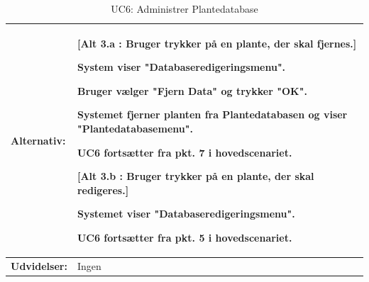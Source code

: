 \begin{table}[h]
\begin{tabularx}{\textwidth}{| >{\raggedright\arraybackslash}p{3.3 cm} | >{\raggedright\arraybackslash}X |}
\textbf{Alternativ:}				& 
\textbf{{[}Alt 3.a : Bruger trykker på en plante, der skal fjernes.{]}}
\begin{packed_enum}
\setcounter{enumi}{3}
\item System viser "Databaseredigeringsmenu".
\item Bruger vælger "Fjern Data" og trykker "OK".
\item Systemet fjerner planten fra Plantedatabasen og viser "Plantedatabasemenu".
\item UC6 fortsætter fra pkt. 7 i hovedscenariet. 
\end{packed_enum}
\textbf{{[}Alt 3.b : Bruger trykker på en plante, der skal redigeres.{]}}
\begin{packed_enum}
\setcounter{enumi}{3}
\item Systemet viser "Databaseredigeringsmenu".
\item UC6 fortsætter fra pkt. 5 i hovedscenariet.
\end{packed_enum}
\\ \hline

\textbf{Udvidelser:}				&  
Ingen
\\ \hline
\end{tabularx}
\caption{UC6: Administrer Plantedatabase}
\label{tbl:UC6}
\end{table}

\clearpage

